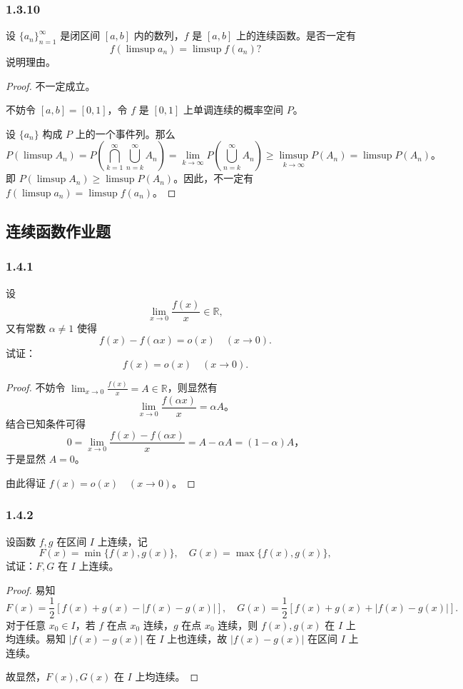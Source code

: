 \documentclass[12pt]{ctexart}
\begin{document}
\subsubsection*{1.3.10}
设 $\{a_n\}_{n=1}^\infty$ 是闭区间 $[a,b]$ 内的数列，$f$ 是 $[a,b]$ 上的连续函数。是否一定有
\[
f(\limsup a_n) = \limsup f(a_n)?
\]
说明理由。
\begin{proof}
不一定成立。

不妨令 $[a, b] = [0, 1]$，令 $f$ 是 $[0, 1]$ 上单调连续的概率空间 $P$。

设 $\{a_n\}$ 构成 $P$ 上的一个事件列。那么
\[
P(\limsup A_n) = P\left(\bigcap_{k=1}^\infty \bigcup_{n=k}^\infty A_n\right) = \lim_{k \to \infty} P\left(\bigcup_{n=k}^\infty A_n\right) \geq \limsup_{k \to \infty} P(A_n) = \limsup P(A_n)。
\]
即 $P(\limsup A_n) \geq \limsup P(A_n)$。因此，不一定有 $f(\limsup a_n) = \limsup f(a_n)$。
\end{proof}

\subsection{连续函数作业题}

\subsubsection*{1.4.1}
设 
\[
\lim_{x \to 0} \frac{f(x)}{x} \in \mathbb{R},
\]
又有常数 $\alpha \neq 1$ 使得
\[
f(x) - f(\alpha x) = o(x) \quad (x \to 0).
\]
试证：
\[
f(x) = o(x) \quad (x \to 0).
\]

\begin{proof}
不妨令 $\lim_{x \to 0} \frac{f(x)}{x} = A \in \mathbb{R}$，则显然有
\[
\lim_{x \to 0} \frac{f(\alpha x)}{x} = \alpha A。
\]
结合已知条件可得
\[
0 = \lim_{x \to 0} \frac{f(x) - f(\alpha x)}{x} = A - \alpha A = (1-\alpha)A，
\]
于是显然 $A = 0$。

由此得证 $f(x) = o(x) \quad (x \to 0)$。
\end{proof}

\subsubsection*{1.4.2}
设函数 $f, g$ 在区间 $I$ 上连续，记
\[
F(x) = \min \{f(x), g(x)\}, \quad G(x) = \max \{f(x), g(x)\},
\]
试证：$F, G$ 在 $I$ 上连续。

\begin{proof}
易知
\[
F(x) = \frac{1}{2} \left[ f(x) + g(x) - |f(x) - g(x)| \right], \quad 
G(x) = \frac{1}{2} \left[ f(x) + g(x) + |f(x) - g(x)| \right].
\]
对于任意 $x_0 \in I$，若 $f$ 在点 $x_0$ 连续，$g$ 在点 $x_0$ 连续，则 $f(x), g(x)$ 在 $I$ 上均连续。易知 $|f(x) - g(x)|$ 在 $I$ 上也连续，故 $|f(x) - g(x)|$ 在区间 $I$ 上连续。

故显然，$F(x), G(x)$ 在 $I$ 上均连续。
\end{proof}
\end{document}
